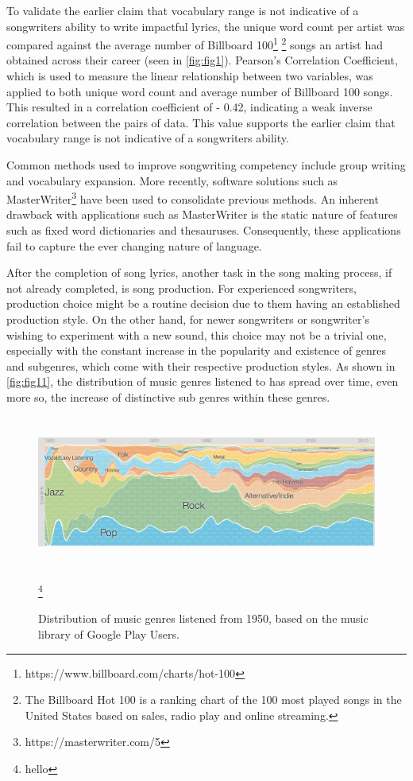 \noindent
\newline
To validate the earlier claim that vocabulary range is not indicative of a songwriters ability to write impactful lyrics, the unique word count per artist was compared against the average number of Billboard 100\footnote{https://www.billboard.com/charts/hot-100} \footnote{The Billboard Hot 100 is a ranking chart of the 100 most played songs in the United States based on sales, radio play and online streaming.} songs an artist had obtained across their career (seen in \autoref{fig:fig1}). Pearson's Correlation Coefficient, which is used to measure the linear relationship between two variables, was applied to both unique word count and average number of Billboard 100 songs. This resulted in a correlation coefficient of - 0.42, indicating a weak inverse correlation between the pairs of data. This value supports the earlier claim that vocabulary range is not indicative of a songwriters ability.

\noindent
\newline
Common methods used to improve songwriting competency include group writing and vocabulary expansion. More recently, software solutions such as MasterWriter\footnote{https://masterwriter.com/5} have been used to consolidate previous methods. An inherent drawback with applications such as MasterWriter is the static nature of features such as fixed word dictionaries and thesauruses. Consequently, these applications fail to capture the ever changing nature of language.

\noindent
\newline
After the completion of song lyrics, another task in the song making process, if not already completed, is song production. For experienced songwriters, production choice might be a routine decision due to them having an established production style. On the other hand, for newer songwriters or songwriter's wishing to experiment with a new sound, this choice may not be a trivial one, especially with the constant increase in the popularity and existence of genres and subgenres, which come with their respective production styles. As shown in \autoref{fig:fig11}, the distribution of music genres listened to has spread over time, even more so, the increase of distinctive sub genres within these genres.

\begin{figure}[h]	
	\includegraphics[width=14cm, height=5cm]{./figures/fig11}
	\centering
	\caption[Distribution of music genres listened to from 1950]{Distribution of music genres listened from 1950, based on the music library of Google Play Users.}
	\footnote{hello}
	\label{fig:fig11}
\end{figure}

